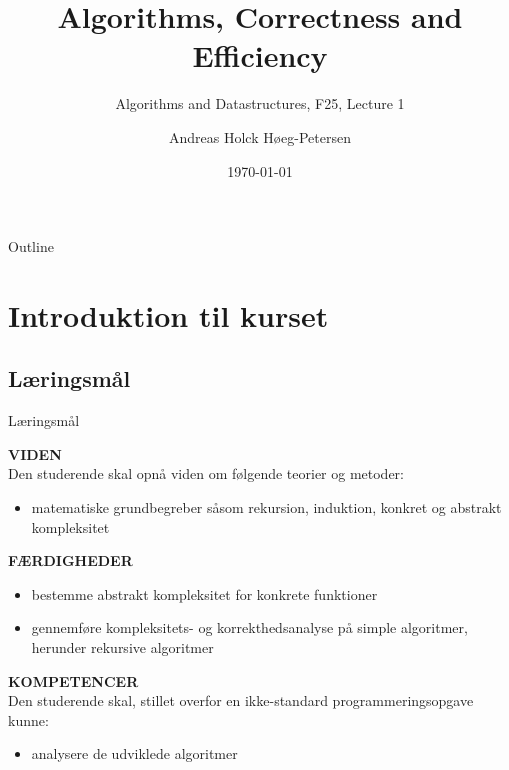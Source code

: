 \documentclass{beamer}
\title[ALG25 - Lecture 1]
{Algorithms, Correctness and Efficiency}
\subtitle
{Algorithms and Datastructures, F25, Lecture 1}
\author[Andreas H. Høeg-Petersen]
{Andreas Holck Høeg-Petersen}
\institute[AAU]{%
  Department of Computer Science\\
  Aalborg University
}
\date {\today}
\begin{document}
\begin{frame}
  \titlepage
\end{frame}

\begin{frame}{Outline}
  \tableofcontents
\end{frame}


\section{Introduktion til kurset}

\subsection[Læringsmål]{Læringsmål}

\begin{frame}{Læringsmål}

    \textbf{VIDEN} \\
    Den studerende skal opnå viden om følgende teorier og metoder:

    \begin{itemize}
        \item \alert{matematiske grundbegreber} såsom rekursion, induktion,
            \alert{konkret og abstrakt kompleksitet}
    \end{itemize}

    \medskip
    \textbf{FÆRDIGHEDER} \\

    \begin{itemize}
        \item \alert{bestemme abstrakt kompleksitet for konkrete funktioner}
        \item \alert{gennemføre kompleksitets-} og korrektheds\alert{analyse på
            simple algoritmer}, herunder rekursive algoritmer
    \end{itemize}

    \medskip
    \textbf{KOMPETENCER} \\
    Den studerende skal, stillet overfor en ikke-standard programmeringsopgave kunne:

    \begin{itemize}
        \item \alert{analysere de udviklede algoritmer}
    \end{itemize}
    
\end{frame}
\end{document}
